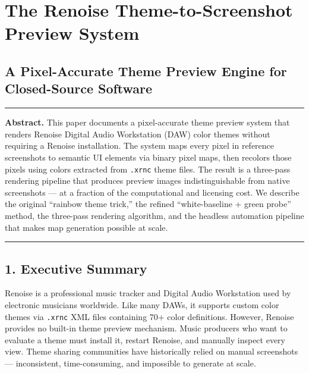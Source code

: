 \documentclass[
  11pt,
  oneside]{report}
\author{}
\date{}
\begin{document}
\chapter{The Renoise Theme-to-Screenshot Preview
System}\label{the-renoise-theme-to-screenshot-preview-system}

\section{A Pixel-Accurate Theme Preview Engine for Closed-Source
Software}\label{a-pixel-accurate-theme-preview-engine-for-closed-source-software}

\begin{center}\rule{0.5\linewidth}{0.5pt}\end{center}

\textbf{Abstract.} This paper documents a pixel-accurate theme preview
system that renders Renoise Digital Audio Workstation (DAW) color themes
without requiring a Renoise installation. The system maps every pixel in
reference screenshots to semantic UI elements via binary pixel maps,
then recolors those pixels using colors extracted from \texttt{.xrnc}
theme files. The result is a three-pass rendering pipeline that produces
preview images indistinguishable from native screenshots --- at a
fraction of the computational and licensing cost. We describe the
original ``rainbow theme trick,'' the refined ``white-baseline + green
probe'' method, the three-pass rendering algorithm, and the headless
automation pipeline that makes map generation possible at scale.

\begin{center}\rule{0.5\linewidth}{0.5pt}\end{center}

\section{1. Executive Summary}\label{executive-summary}

Renoise is a professional music tracker and Digital Audio Workstation
used by electronic musicians worldwide. Like many DAWs, it supports
custom color themes via \texttt{.xrnc} XML files containing 70+ color
definitions. However, Renoise provides no built-in theme preview
mechanism. Music producers who want to evaluate a theme must install it,
restart Renoise, and manually inspect every view. Theme sharing
communities have historically relied on manual screenshots ---
inconsistent, time-consuming, and impossible to generate at scale.
\end{document}
